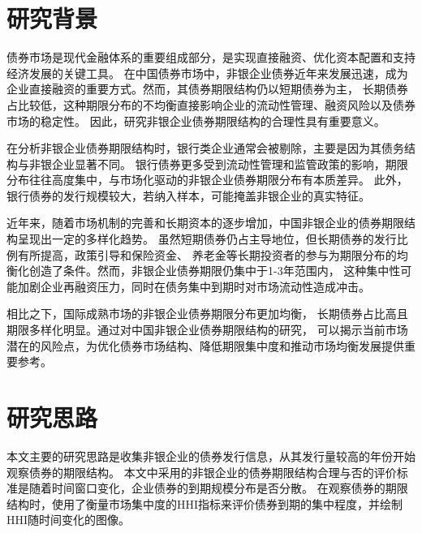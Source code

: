 \documentclass[a4paper,12pt]{report}
\begin{document}
    \chapter*{ \heiti \MYTITLE}
    \setcounter{page}{1}
    
    \chapter{研究背景}

    债券市场是现代金融体系的重要组成部分，是实现直接融资、优化资本配置和支持经济发展的关键工具。
    在中国债券市场中，非银企业债券近年来发展迅速，成为企业直接融资的重要方式。然而，其债券期限结构仍以短期债券为主，
    长期债券占比较低，这种期限分布的不均衡直接影响企业的流动性管理、融资风险以及债券市场的稳定性。
    因此，研究非银企业债券期限结构的合理性具有重要意义。

    在分析非银企业债券期限结构时，银行类企业通常会被剔除，主要是因为其债务结构与非银企业显著不同。
    银行债券更多受到流动性管理和监管政策的影响，期限分布往往高度集中，与市场化驱动的非银企业债券期限分布有本质差异。
    此外，银行债券的发行规模较大，若纳入样本，可能掩盖非银企业的真实特征。

    近年来，随着市场机制的完善和长期资本的逐步增加，中国非银企业的债券期限结构呈现出一定的多样化趋势。
    虽然短期债券仍占主导地位，但长期债券的发行比例有所提高，政策引导和保险资金、
    养老金等长期投资者的参与为期限分布的均衡化创造了条件。然而，非银企业债券期限仍集中于1-3年范围内，
    这种集中性可能加剧企业再融资压力，同时在债务集中到期时对市场流动性造成冲击。

    相比之下，国际成熟市场的非银企业债券期限分布更加均衡，
    长期债券占比高且期限多样化明显。通过对中国非银企业债券期限结构的研究，
    可以揭示当前市场潜在的风险点，为优化债券市场结构、降低期限集中度和推动市场均衡发展提供重要参考。
    
    \chapter{研究思路}

    本文主要的研究思路是收集非银企业的债券发行信息，从其发行量较高的年份开始观察债券的期限结构。
    本文中采用的非银企业的债券期限结构合理与否的评价标准是随着时间窗口变化，企业债券的到期规模分布是否分散。
    在观察债券的期限结构时，使用了衡量市场集中度的HHI指标来评价债券到期的集中程度，并绘制HHI随时间变化的图像。
\end{document}
